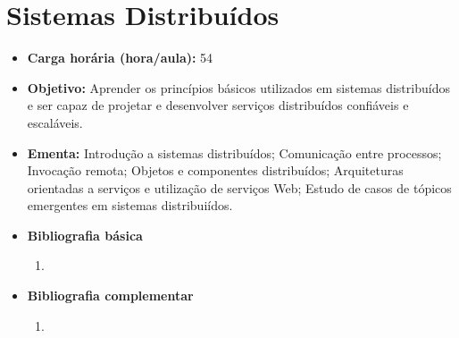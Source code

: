 \documentclass[11pt,fleqn]{book} %
\begin{document}
\section{Sistemas Distribuídos}\label{5_sd}
\begin{itemize}
	\item \textbf{Carga horária (hora/aula):} 54
	\item \textbf{Objetivo:} Aprender os princípios básicos utilizados em sistemas distribuídos e ser capaz de projetar e desenvolver serviços distribuídos confiáveis e escaláveis.
	\item \textbf{Ementa:} 
	Introdução a sistemas distribuídos; 
	Comunicação entre processos; 
	Invocação remota; 
	Objetos e componentes distribuídos; 
	Arquiteturas orientadas a serviços e utilização de serviços Web;  
	Estudo de casos de tópicos emergentes em sistemas distribuiídos.
	\item \textbf{Bibliografia básica}
	\begin{enumerate}
		\item 
	\end{enumerate}
	\item \textbf{Bibliografia complementar}
	\begin{enumerate}
		\item 	
	\end{enumerate}	
\end{itemize}


\newpage
\end{document}
